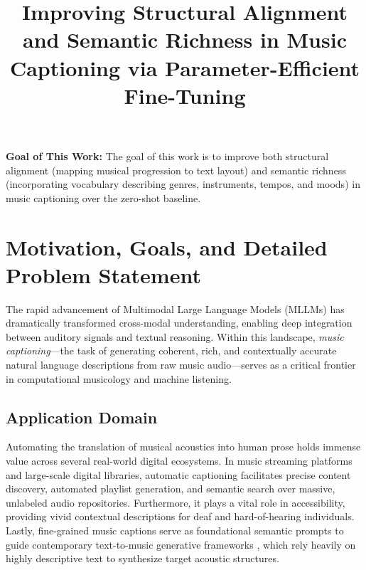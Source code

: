 \documentclass[12pt, conference, letterpaper]{IEEEtran}
\begin{document}
\title{Improving Structural Alignment and Semantic Richness in Music Captioning via Parameter-Efficient Fine-Tuning}
\author{
}

\maketitle
\thispagestyle{plain}
\pagestyle{plain}


\noindent\textbf{Goal of This Work:} The goal of this work is to improve both structural alignment (mapping musical progression to text layout) and semantic richness (incorporating vocabulary describing genres, instruments, tempos, and moods) in music captioning over the zero-shot baseline.

\section{Motivation, Goals, and Detailed Problem Statement}
\label{sec:motivation}

The rapid advancement of Multimodal Large Language Models (MLLMs) has dramatically transformed cross-modal understanding, enabling deep integration between auditory signals and textual reasoning. Within this landscape, \textit{music captioning}---the task of generating coherent, rich, and contextually accurate natural language descriptions from raw music audio---serves as a critical frontier in computational musicology and machine listening.

\subsection{Application Domain}
Automating the translation of musical acoustics into human prose holds immense value across several real-world digital ecosystems. In music streaming platforms and large-scale digital libraries, automatic captioning facilitates precise content discovery, automated playlist generation, and semantic search over massive, unlabeled audio repositories. Furthermore, it plays a vital role in accessibility, providing vivid contextual descriptions for deaf and hard-of-hearing individuals. Lastly, fine-grained music captions serve as foundational semantic prompts to guide contemporary text-to-music generative frameworks \cite{musicgen, musiccaps}, which rely heavily on highly descriptive text to synthesize target acoustic structures.
\end{document}
